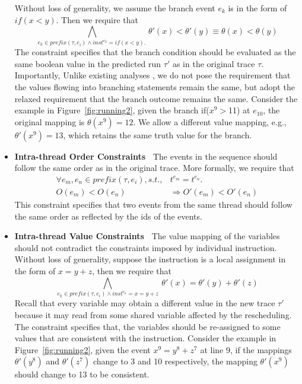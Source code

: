 \begin{itemize}
Without loss of generality, we assume the branch event $e_k$ is in the form of $if(x<y)$. Then  we require that 
$$
\bigwedge_{e_k \in prefix(\tau,e_i) \wedge  inst^{e_k}=if(x<y).\ }  \theta'(x)<\theta'(y) 	\equiv \theta(x)<\theta(y)
$$ 
The constraint specifies that the branch condition should be evaluated as 
the same boolean value in the predicted run $\tau'$ as in the original 
trace $\tau$.
 Importantly, Unlike existing analyses \cite{yannis,pldi14}, we do not 
pose the requirement that the values flowing into branching statements 
remain the same, but adopt the relaxed requirement that 
the branch outcome remains the same.
Consider the example in Figure~\ref{fig:running2}, given the branch 
if($x^9$$>$11) at $e_{10}$, the original mapping is $\theta(x^9)=12$. We allow  
a different value mapping, e.g., $\theta'(x^9)=13$, which retains the 
same truth value for the branch.
\item {\bf Intra-thread Order Constraints\ } The events in the sequence 
should follow the same order as in the original trace. More formally, 
we require that
$$
\begin{array}{rl}
\forall e_m, e_n \in prefix(\tau,e_i), s.t., & t^{e_m} = t^{e_n}. \\
 O(e_m) < O(e_n)\  & \Rightarrow O'(e_{m}) < O'(e_{n}) 
\end{array}
$$ 
This constraint specifies that two events from the same thread should 
follow the same order as reflected by the ids of the events.
\item {\bf Intra-thread Value Constraints\ } The value mapping of the 
variables should not contradict the constraints imposed by individual 
instruction.   Without loss of generality, suppose the instruction is 
a local assignment in the form of $x=y+z$, then we require that
$$
\bigwedge_{e_k \in prefix(\tau,e_i) \wedge inst^{e_k}=x=y+z}\
	\theta'(x)=\theta'(y)+\theta'(z)
$$
Recall that every variable may obtain a different value in the new 
trace $\tau'$ because it may read from some shared variable affected by 
the rescheduling. The constraint specifies that, the variables should 
be re-assigned to some values that are consistent with the instruction. 
Consider the example in Figure~\ref{fig:running2}, given the 
event $x^9=y^8+z^7$ at line 9, if the mappings $\theta'(y^8)$ and 
$\theta'(z^7)$ change to 3 and 10 respectively, the 
mapping $\theta'(x^9)$ should change to 13 to be consistent. 
\end{itemize}



